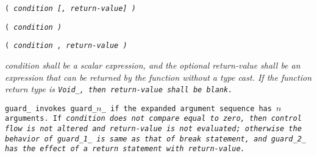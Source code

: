 
\s\s\s\tt{(} \it{condition} [\tt{,} \it{return-value}\opt] \tt{)}

\s\tt{(} \it{condition} \tt{)}

\s\tt{(} \it{condition} \phantom{[}\tt{,} \it{return-value}\opt\phantom{]} \tt{)}


\it{condition} shall be a scalar expression, and the optional \it{return-value}
shall be an expression that can be returned by the function without a type cast.
If the function return type is \tt{Void_}, then \it{return-value} shall be blank.


\tt{guard_} invokes \tt{guard_}$n$\_ if the
expanded argument sequence has $n$ arguments.
If \it{condition} does not compare equal to zero,
then control flow is not altered and \it{return-value} is not evaluated;
otherwise the behavior of \tt{guard_1_} is same as that of \tt{break} statement,
and \tt{guard_2_} has the effect of a return statement with \it{return-value}.
